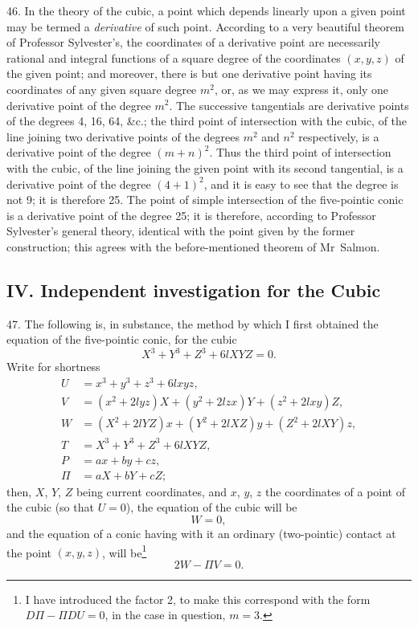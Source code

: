 \documentclass[11pt,a4paper]{article}
\theoremstyle{definition}
\begin{document}
46. In the theory of the cubic, a point which depends linearly upon a given point may be termed a \textit{derivative} of such point. According to a very beautiful theorem of Professor Sylvester's, the coordinates of a derivative point are necessarily rational and integral functions of a square degree of the coordinates $(x,y,z)$ of the given point; and moreover, there is but one derivative point having its coordinates of any given square degree $m^2$, or, as we may express it, only one derivative point of the degree $m^2$. The successive tangentials are derivative points of the degrees 4, 16, 64, \&c.; the third point of intersection with the cubic, of the line joining two derivative points of the degrees $m^2$ and $n^2$ respectively, is a derivative point of the degree $(m+n)^2$. Thus the third point of intersection with the cubic, of the line joining the given point with its second tangential, is a derivative point of the degree $(4+1)^2$, and it is easy to see that the degree is not 9; it is therefore 25. The point of simple intersection of the five-pointic conic is a derivative point of the degree 25; it is therefore, according to Professor Sylvester's general theory, identical with the point given by the former construction; this agrees with the before-mentioned theorem of Mr~Salmon.

\subsection*{IV. Independent investigation for the Cubic}

47. The following is, in substance, the method by which I first obtained the equation of the five-pointic conic, for the cubic
\[
X^3+Y^3+Z^3+6lXYZ=0.
\]
Write for shortness
\begin{align*}
U &= x^3+y^3+z^3+6lxyz,\\
V &= (x^2+2lyz)X+(y^2+2lzx)Y+(z^2+2lxy)Z,\\
W &= (X^2+2lYZ)x+(Y^2+2lXZ)y+(Z^2+2lXY)z,\\
T &= X^3+Y^3+Z^3+6lXYZ,\\
P &= ax+by+cz,\\
\Pi &= aX+bY+cZ;
\end{align*}
then, $X$, $Y$, $Z$ being current coordinates, and $x$, $y$, $z$ the coordinates of a point of the cubic (so that $U=0$), the equation of the cubic will be
\[
W=0,
\]
and the equation of a conic having with it an ordinary (two-pointic) contact at the point $(x,y,z)$, will be\footnote{I have introduced the factor 2, to make this correspond with the form $D\Pi-\Pi DU=0$, in the case in question, $m=3$.}
\[
2W-\Pi V=0.
\]
\end{document}

